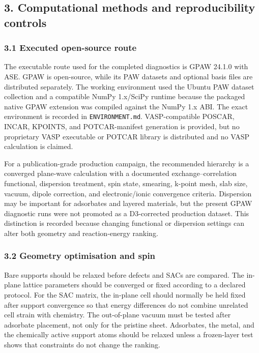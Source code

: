 \documentclass[
]{article}
\begin{document}
\hypertarget{computational-methods-and-reproducibility-controls}{%
\subsection{3. Computational methods and reproducibility
controls}\label{computational-methods-and-reproducibility-controls}}

\hypertarget{executed-open-source-route}{%
\subsubsection{3.1 Executed open-source
route}\label{executed-open-source-route}}

The executable route used for the completed diagnostics is GPAW 24.1.0
with ASE. GPAW is open-source, while its PAW datasets and optional basis
files are distributed separately. The working environment used the
Ubuntu PAW dataset collection and a compatible NumPy 1.x/SciPy runtime
because the packaged native GPAW extension was compiled against the
NumPy 1.x ABI. The exact environment is recorded in
\texttt{ENVIRONMENT.md}. VASP-compatible POSCAR, INCAR, KPOINTS, and
POTCAR-manifest generation is provided, but no proprietary VASP
executable or POTCAR library is distributed and no VASP calculation is
claimed.

For a publication-grade production campaign, the recommended hierarchy
is a converged plane-wave calculation with a documented
exchange--correlation functional, dispersion treatment, spin state,
smearing, k-point mesh, slab size, vacuum, dipole correction, and
electronic/ionic convergence criteria. Dispersion may be important for
adsorbates and layered materials, but the present GPAW diagnostic runs
were not promoted as a D3-corrected production dataset. This distinction
is recorded because changing functional or dispersion settings can alter
both geometry and reaction-energy ranking.

\hypertarget{geometry-optimisation-and-spin}{%
\subsubsection{3.2 Geometry optimisation and
spin}\label{geometry-optimisation-and-spin}}

Bare supports should be relaxed before defects and SACs are compared.
The in-plane lattice parameters should be converged or fixed according
to a declared protocol. For the SAC matrix, the in-plane cell should
normally be held fixed after support convergence so that energy
differences do not combine unrelated cell strain with chemistry. The
out-of-plane vacuum must be tested after adsorbate placement, not only
for the pristine sheet. Adsorbates, the metal, and the chemically active
support atoms should be relaxed unless a frozen-layer test shows that
constraints do not change the ranking.
\end{document}
